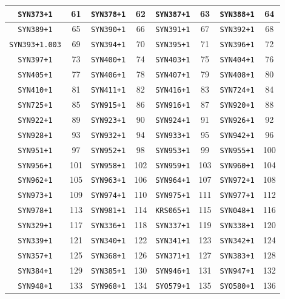 \documentclass[./main.tex]{subfiles}
\begin{document}
\begin{table}
{\begin{tabular}{|c|c|c|c|c|c|c|c|}
\hline
\texttt{SYN373+1} & 61 & \texttt{SYN378+1} & 62 & \texttt{SYN387+1} & 63 & \texttt{SYN388+1} & 64\\
\hline
\texttt{SYN389+1} & 65 & \texttt{SYN390+1} & 66 & \texttt{SYN391+1} & 67 & \texttt{SYN392+1} & 68\\
\hline
\texttt{SYN393+1.003} & 69 & \texttt{SYN394+1} & 70 & \texttt{SYN395+1} & 71 & \texttt{SYN396+1} & 72\\
\hline
\texttt{SYN397+1} & 73 & \texttt{SYN400+1} & 74 & \texttt{SYN403+1} & 75 & \texttt{SYN404+1} & 76\\
\hline
\texttt{SYN405+1} & 77 & \texttt{SYN406+1} & 78 & \texttt{SYN407+1} & 79 & \texttt{SYN408+1} & 80\\
\hline
\texttt{SYN410+1} & 81 & \texttt{SYN411+1} & 82 & \texttt{SYN416+1} & 83 & \texttt{SYN724+1} & 84\\
\hline
\texttt{SYN725+1} & 85 & \texttt{SYN915+1} & 86 & \texttt{SYN916+1} & 87 & \texttt{SYN920+1} & 88\\
\hline
\texttt{SYN922+1} & 89 & \texttt{SYN923+1} & 90 & \texttt{SYN924+1} & 91 & \texttt{SYN926+1} & 92\\
\hline
\texttt{SYN928+1} & 93 & \texttt{SYN932+1} & 94 & \texttt{SYN933+1} & 95 & \texttt{SYN942+1} & 96\\
\hline
\texttt{SYN951+1} & 97 & \texttt{SYN952+1} & 98 & \texttt{SYN953+1} & 99 & \texttt{SYN955+1} & 100\\
\hline
\texttt{SYN956+1} & 101 & \texttt{SYN958+1} & 102 & \texttt{SYN959+1} & 103 & \texttt{SYN960+1} & 104\\
\hline
\texttt{SYN962+1} & 105 & \texttt{SYN963+1} & 106 & \texttt{SYN964+1} & 107 & \texttt{SYN972+1} & 108\\
\hline
\texttt{SYN973+1} & 109 & \texttt{SYN974+1} & 110 & \texttt{SYN975+1} & 111 & \texttt{SYN977+1} & 112\\
\hline
\texttt{SYN978+1} & 113 & \texttt{SYN981+1} & 114 & \texttt{KRS065+1} & 115 & \texttt{SYN048+1} & 116\\
\hline
\texttt{SYN329+1} & 117 & \texttt{SYN336+1} & 118 & \texttt{SYN337+1} & 119 & \texttt{SYN338+1} & 120\\
\hline
\texttt{SYN339+1} & 121 & \texttt{SYN340+1} & 122 & \texttt{SYN341+1} & 123 & \texttt{SYN342+1} & 124\\
\hline
\texttt{SYN357+1} & 125 & \texttt{SYN368+1} & 126 & \texttt{SYN371+1} & 127 & \texttt{SYN383+1} & 128\\
\hline
\texttt{SYN384+1} & 129 & \texttt{SYN385+1} & 130 & \texttt{SYN946+1} & 131 & \texttt{SYN947+1} & 132\\
\hline
\texttt{SYN948+1} & 133 & \texttt{SYN968+1} & 134 & \texttt{SYO579+1} & 135 & \texttt{SYO580+1} & 136\\
\hline
\end{tabular}
}
\end{table}
\end{document}
